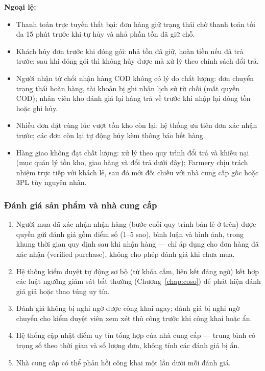 \noindent\textbf{Ngoại lệ:}
\begin{itemize}
    \item Thanh toán trực tuyến thất bại: đơn hàng giữ trạng thái chờ thanh toán tối đa 15 phút trước khi tự hủy và nhả phần tồn đã giữ chỗ.
    \item Khách hủy đơn trước khi đóng gói: nhả tồn đã giữ, hoàn tiền nếu đã trả trước; sau khi đóng gói thì không hủy được mà xử lý theo chính sách đổi trả.
    \item Người nhận từ chối nhận hàng COD không có lý do chất lượng: đơn chuyển trạng thái hoàn hàng, tài khoản bị ghi nhận lịch sử từ chối (mất quyền COD); nhân viên kho đánh giá lại hàng trả về trước khi nhập lại dòng tồn hoặc ghi hủy.
    \item Nhiều đơn đặt cùng lúc vượt tồn kho còn lại: hệ thống ưu tiên đơn xác nhận trước; các đơn còn lại tự động hủy kèm thông báo hết hàng.
    \item Hàng giao không đạt chất lượng: xử lý theo quy trình đổi trả và khiếu nại (mục quản lý tồn kho, giao hàng và đổi trả dưới đây); Farmery chịu trách nhiệm trực tiếp với khách lẻ, sau đó mới đối chiếu với nhà cung cấp gốc hoặc 3PL tùy nguyên nhân.
\end{itemize}

\subsubsection*{Đánh giá sản phẩm và nhà cung cấp}
\label{subsec:danhgianghiepvu}

\begin{enumerate}
    \item Người mua đã xác nhận nhận hàng (bước cuối quy trình bán lẻ ở trên) được quyền gửi đánh giá gồm điểm số (1--5 sao), bình luận và hình ảnh, trong khung thời gian quy định sau khi nhận hàng --- chỉ áp dụng cho đơn hàng đã xác nhận (verified purchase), không cho phép đánh giá khi chưa mua.
    \item Hệ thống kiểm duyệt tự động sơ bộ (từ khóa cấm, liên kết đáng ngờ) kết hợp các luật ngưỡng giám sát bất thường (Chương~\ref{chap:coso}) để phát hiện đánh giá giả hoặc thao túng uy tín.
    \item Đánh giá không bị nghi ngờ được công khai ngay; đánh giá bị nghi ngờ chuyển cho kiểm duyệt viên xem xét thủ công trước khi công khai hoặc ẩn.
    \item Hệ thống cập nhật điểm uy tín tổng hợp của nhà cung cấp --- trung bình có trọng số theo thời gian và số lượng đơn, không tính các đánh giá bị ẩn.
    \item Nhà cung cấp có thể phản hồi công khai một lần dưới mỗi đánh giá.
\end{enumerate}

